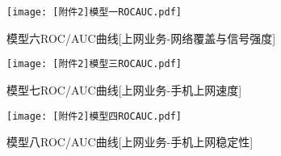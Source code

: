\documentclass{MathorCupmodeling}
\begin{document}
	\begin{figure}[H]
		\centerline{\texttt{[image: [附件2]模型一ROCAUC.pdf]}}
		\caption{模型六ROC/AUC曲线[上网业务-网络覆盖与信号强度]}\label{fig:SixthModelROCAUC}
	\end{figure}
	\begin{figure}[H]
		\centerline{\texttt{[image: [附件2]模型三ROCAUC.pdf]}}
		\caption{模型七ROC/AUC曲线[上网业务-手机上网速度]}\label{fig:SeventhModelROCAUC}
	\end{figure}
	\begin{figure}[H]
		\centerline{\texttt{[image: [附件2]模型四ROCAUC.pdf]}}
		\caption{模型八ROC/AUC曲线[上网业务-手机上网稳定性]}\label{fig:EighthModelROCAUC}
	\end{figure}
\newpage
	~\\
\end{document}
